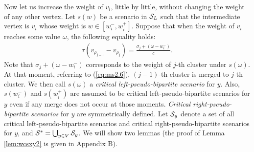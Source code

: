 \documentclass[a4paper]{llncs}
\begin{document}
Now let us increase the weight of $v_i$, little by little, without changing the weight of any other vertex.
Let 
$s(w)$ be a scenario in ${\cal S}_L$ such that the intermediate vertex is $v_i$ whose weight is $w \in [w^-_i, w^+_i]$.
Suppose that when the weight of $v_i$ reaches some value $\omega$, the following equality holds:
\begin{eqnarray}
\tau(v_{\rho_{j-1}}-v_{\rho_j}) = \frac{\sigma_j+(\omega-w^-_i)}{c}.
\label{eq:cpbs1} 
\end{eqnarray}
Note that $\sigma_j+(\omega-w^-_i)$ corresponds to the weight of $j$-th cluster under $s(\omega)$.
At that moment, referring to (\ref{eq:ms2.6}), $(j-1)$-th cluster is merged to $j$-th cluster.
We then call $s(\omega)$ a {\it critical left-pseudo-bipartite scenario} for $y$.
Also, 
$s(w^-_i)$ and $s(w^+_i)$ are assumed to be critical left-pseudo-bipartite scenarios for $y$
even if any merge does not occur at those moments.
{\it Critical right-pseudo-bipartite scenarios} for $y$ are symmetrically defined.
Let ${\cal S}_y$ denote a set of all critical left-pseudo-bipartite scenarios and critical right-pseudo-bipartite scenarios for $y$,
and ${\cal S}^* = \bigcup_{y \in V}{\cal S}_y$.
We will show two lemmas
(the proof of Lemma \ref{lem:wcsxy2} is given in Appendix B).
\end{document}
